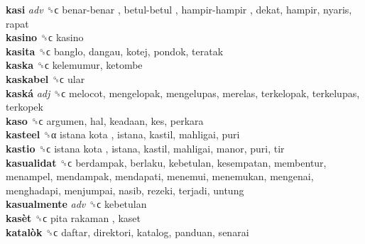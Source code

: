 \textbf{kasi} \emph{adv}  ␝ϲ   benar-benar ,  betul-betul ,  hampir-hampir , dekat, hampir, nyaris, rapat  \\
\textbf{kasino} ␝ϲ  kasino  \\
\textbf{kasita} ␝ϲ  banglo, dangau, kotej, pondok, teratak  \\
\textbf{kaska} ␝ϲ  kelemumur, ketombe  \\
\textbf{kaskabel} ␝ϲ  ular  \\
\textbf{kaská} \emph{adj}  ␝ϲ  melocot, mengelopak, mengelupas, merelas, terkelopak, terkelupas, terkopek  \\
\textbf{kaso} ␝ϲ  argumen, hal, keadaan, kes, perkara  \\
\textbf{kasteel} ␝α   istana kota , istana, kastil, mahligai, puri  \\
\textbf{kastio} ␝ϲ   istana kota , istana, kastil, mahligai, manor, puri, tir  \\
\textbf{kasualidat} ␝ϲ  berdampak, berlaku, kebetulan, kesempatan, membentur, menampel, mendampak, mendapati, menemui, menemukan, mengenai, menghadapi, menjumpai, nasib, rezeki, terjadi, untung  \\
\textbf{kasualmente} \emph{adv}  ␝ϲ  kebetulan  \\
\textbf{kasèt} ␝ϲ   pita rakaman , kaset  \\
\textbf{katalòk} ␝ϲ  daftar, direktori, katalog, panduan, senarai  \\

